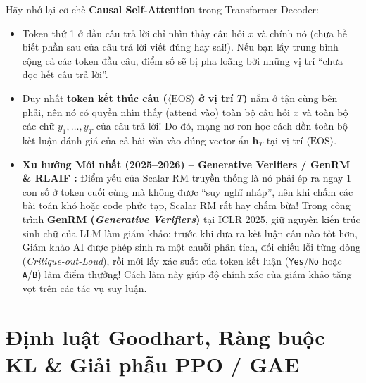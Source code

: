 \begin{debate}
Hãy nhớ lại cơ chế \textbf{Causal Self-Attention} trong Transformer Decoder:
\begin{itemize}[leftmargin=1.2cm]
    \item Token thứ 1 ở đầu câu trả lời chỉ nhìn thấy câu hỏi $x$ và chính nó (chưa hề biết phần sau của câu trả lời viết đúng hay sai!). Nếu bạn lấy trung bình cộng cả các token đầu câu, điểm số sẽ bị pha loãng bởi những vị trí ``chưa đọc hết câu trả lời''.
    \item Duy nhất \textbf{token kết thúc câu ($\langle\text{EOS}\rangle$ ở vị trí $T$)} nằm ở tận cùng bên phải, nên nó có quyền nhìn thấy (attend vào) toàn bộ câu hỏi $x$ và toàn bộ các chữ $y_1, \dots, y_T$ của câu trả lời! Do đó, mạng nơ-ron học cách dồn toàn bộ kết luận đánh giá của cả bài văn vào đúng vector ẩn $\mathbf{h}_T$ tại vị trí $\langle\text{EOS}\rangle$.
\end{itemize}
\end{debate}

\begin{itemize}[leftmargin=1.2cm]
    \item \textbf{Xu hướng Mới nhất (2025--2026) -- Generative Verifiers / GenRM \citep{zhang2025generative} \& RLAIF \citep{bai2022constitutional, lee2023rlaif}:}
    Điểm yếu của Scalar RM truyền thống là nó phải ép ra ngay 1 con số ở token cuối cùng mà không được ``suy nghĩ nháp'', nên khi chấm các bài toán khó hoặc code phức tạp, Scalar RM rất hay chấm bừa!
    Trong công trình \textbf{GenRM (\textit{Generative Verifiers})} tại ICLR 2025, \citet{zhang2025generative} giữ nguyên kiến trúc sinh chữ của LLM làm giám khảo: trước khi đưa ra kết luận câu nào tốt hơn, Giám khảo AI được phép sinh ra một chuỗi phân tích, đối chiếu lỗi từng dòng (\textit{Critique-out-Loud}), rồi mới lấy xác suất của token kết luận (\texttt{Yes}/\texttt{No} hoặc \texttt{A}/\texttt{B}) làm điểm thưởng! Cách làm này giúp độ chính xác của giám khảo tăng vọt trên các tác vụ suy luận.
\end{itemize}

\section{Định luật Goodhart, Ràng buộc KL \& Giải phẫu PPO / GAE}
\label{sec:goodhart_ppo_eng}

